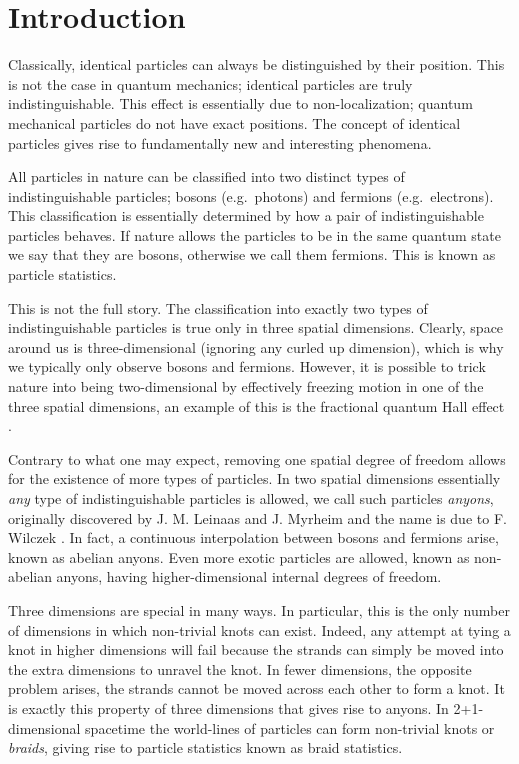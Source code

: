 
\chapter{Introduction}

Classically, identical particles can always be distinguished by their position. This is not the case in quantum mechanics; identical particles are truly indistinguishable. This effect is essentially due to non-localization; quantum mechanical particles do not have exact positions. The concept of identical particles gives rise to fundamentally new and interesting phenomena.

All particles in nature can be classified into two distinct types of indistinguishable particles; bosons (e.g.\ photons) and fermions (e.g.\ electrons).
This classification is essentially determined by how a pair of indistinguishable particles behaves. If nature allows the particles to be in the same quantum state we say that they are bosons, otherwise we call them fermions. This is known as particle statistics.

This is not the full story. The classification into exactly two types of indistinguishable particles is true only in three spatial dimensions. Clearly, space around us is three-dimensional (ignoring any curled up dimension), which is why we typically only observe bosons and fermions. However, it is possible to trick nature into being two-dimensional by effectively freezing motion in one of the three spatial dimensions, an example of this is the fractional quantum Hall effect \cite{laughlin,strömer}.

Contrary to what one may expect, removing one spatial degree of freedom allows for the existence of more types of particles. In two spatial dimensions essentially \emph{any} type of indistinguishable particles is allowed, we call such particles \emph{anyons}, originally discovered by J. M. Leinaas and J. Myrheim \cite{leinaas myrheim} and the name is due to F. Wilczek \cite{wilczek}. In fact, a continuous interpolation between bosons and fermions arise, known as abelian anyons. Even more exotic particles are allowed, known as non-abelian anyons, having higher-dimensional internal degrees of freedom.

Three dimensions are special in many ways. In particular, this is the only number of dimensions in which non-trivial knots can exist. Indeed, any attempt at tying a knot in higher dimensions will fail because the strands can simply be moved into the extra dimensions to unravel the knot. In fewer dimensions, the opposite problem arises, the strands cannot be moved across each other to form a knot. It is exactly this property of three dimensions that gives rise to anyons. In 2+1-dimensional spacetime the world-lines of particles can form non-trivial knots or \emph{braids}, giving rise to particle statistics known as braid statistics.

